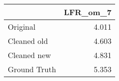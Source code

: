 \begin{tabular}{lr}
\toprule
{} & LFR_om_7 \\
\midrule
Original     &    4.011 \\
Cleaned old  &    4.603 \\
Cleaned new  &    4.831 \\
Ground Truth &    5.353 \\
\bottomrule
\end{tabular}
